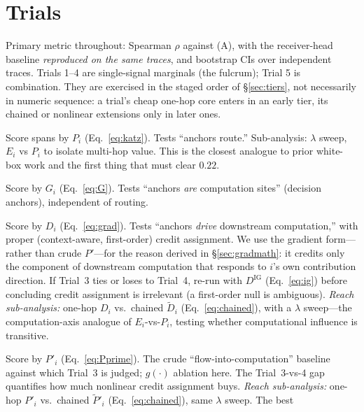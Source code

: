 \documentclass[11pt]{article}
\begin{document}
\section{Trials}
\label{sec:trials}
Primary metric throughout: Spearman $\rho$ against (A), with the receiver-head baseline
\cite{bogdan2025thought} \emph{reproduced on the same traces}, and bootstrap CIs over independent
traces. Trials 1--4 are single-signal marginals (the fulcrum); Trial 5 is combination. They are
exercised in the staged order of \S\ref{sec:tiers}, not necessarily in numeric sequence: a trial's cheap
one-hop core enters in an early tier, its chained or nonlinear extensions only in later ones.

\begin{description}[leftmargin=0pt,itemsep=4pt]
\item[\textbf{Trial 1 --- Propagated attention only.}] Score spans by $P_i$ (Eq.~\ref{eq:katz}).
Tests ``anchors route.'' Sub-analysis: $\lambda$ sweep, $E_i$ vs $P_i$ to isolate multi-hop value.
This is the closest analogue to prior white-box work and the first thing that must clear $0.22$.
\item[\textbf{Trial 2 --- Own computation.}] Score by $G_i$ (Eq.~\ref{eq:G}). Tests ``anchors
\emph{are} computation sites'' (decision anchors), independent of routing.
\item[\textbf{Trial 3 --- Gradient-scaled outflow.}] Score by $D_i$ (Eq.~\ref{eq:grad}). Tests
``anchors \emph{drive} downstream computation,'' with proper (context-aware, first-order) credit
assignment. We use the gradient form---rather than crude $P'$---for the reason derived in
\S\ref{sec:gradmath}: it credits only the component of downstream computation that responds to $i$'s
own contribution direction. If Trial~3 ties or loses to Trial~4, re-run with $D^{\mathrm{IG}}$
(Eq.~\ref{eq:ig}) before concluding credit assignment is irrelevant (a first-order null is ambiguous).
\emph{Reach sub-analysis:} one-hop $D_i$ vs.\ chained $\widetilde D_i$ (Eq.~\ref{eq:chained}), with a
$\lambda$ sweep---the computation-axis analogue of $E_i$-vs-$P_i$, testing whether computational
influence is transitive.
\item[\textbf{Trial 4 --- Computation-weighted outflow.}] Score by $P'_i$ (Eq.~\ref{eq:Pprime}). The
crude ``flow-into-computation'' baseline against which Trial~3 is judged; $g(\cdot)$ ablation here. The
Trial~3-vs-4 gap quantifies how much nonlinear credit assignment buys. \emph{Reach sub-analysis:}
one-hop $P'_i$ vs.\ chained $\widetilde P'_i$ (Eq.~\ref{eq:chained}), same $\lambda$ sweep. The best

\end{description}
\end{document}
